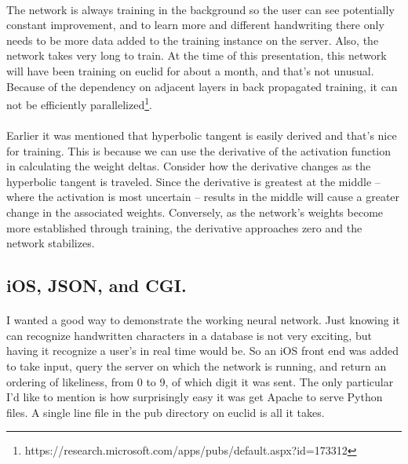 \documentclass{article}
\begin{document}
    \paragraph{}The network is always training in the background so the user can 
    see potentially constant improvement, and to learn more and different 
    handwriting there only needs to be more data added to the training instance 
    on the server. Also, the network takes very long to train. At the time of this 
    presentation, this network will have been training on euclid for about a 
    month, and that's not unusual. Because of the dependency on 
    adjacent layers in back propagated training, it can not be efficiently 
    parallelized\footnote{
    https://research.microsoft.com/apps/pubs/default.aspx?id=173312}.

    \paragraph{}Earlier it was mentioned that hyperbolic tangent is easily derived
    and that's nice for training. This is because we can use the derivative of the 
    activation function in calculating the weight deltas. Consider how the 
    derivative changes as the hyperbolic tangent is traveled. Since the derivative 
    is greatest at the middle -- where the activation is most uncertain -- results 
    in the middle will cause a greater change in the associated weights. 
    Conversely, as the network's weights become more established through training, 
    the derivative approaches zero and the network stabilizes.

\subsection{iOS, JSON, and CGI.}

    \paragraph{}I wanted a good way to demonstrate the working neural network. Just
    knowing it can recognize handwritten characters in a database is not very 
    exciting, but having it recognize a user's in real time would be. So an iOS 
    front end was added to take input, query the server on which the network is 
    running, and return an ordering of likeliness, from 0 to 9, of which digit it 
    was sent. The only particular I'd like to mention is how surprisingly easy it 
    was get Apache to serve Python files. A single line file in the pub directory 
    on euclid is all it takes. \\
\end{document}
